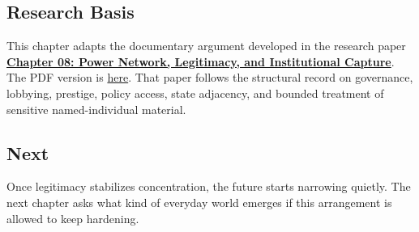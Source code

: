 \documentclass[
  american,
  12pt,
  letterpaper,
]{article}
\begin{document}
\subsection{Research Basis}\label{research-basis}

This chapter adapts the documentary argument developed in the research
paper
\href{../../papers/html/08_legitimacy-and-institutional-capture_paper.html}{\textbf{Chapter
08: Power Network, Legitimacy, and Institutional Capture}}. The PDF
version is
\href{../../papers/pdf/08_legitimacy-and-institutional-capture_paper/08_legitimacy-and-institutional-capture_paper.pdf}{here}.
That paper follows the structural record on governance, lobbying,
prestige, policy access, state adjacency, and bounded treatment of
sensitive named-individual material.

\subsection{Next}\label{next}

Once legitimacy stabilizes concentration, the future starts narrowing
quietly. The next chapter asks what kind of everyday world emerges if
this arrangement is allowed to keep hardening.
\end{document}
